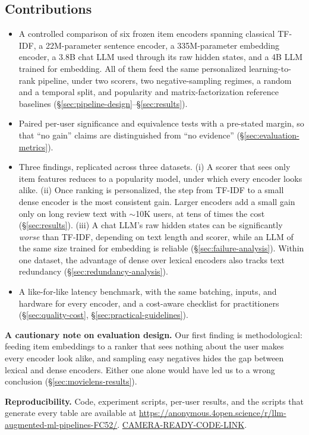 \subsection{Contributions}
\begin{itemize}
  \item A controlled comparison of six frozen item encoders spanning
    classical TF-IDF, a 22M-parameter sentence encoder, a 335M-parameter
    embedding encoder, a 3.8B chat LLM used through its raw hidden
    states, and a 4B LLM trained for embedding. All of them feed the
    same personalized learning-to-rank pipeline, under two scorers, two
    negative-sampling regimes, a random and a temporal split, and
    popularity and matrix-factorization reference baselines
    (\S\ref{sec:pipeline-design}--\S\ref{sec:results}).
  \item Paired per-user significance and equivalence tests with a
    pre-stated margin, so that ``no gain'' claims are distinguished from
    ``no evidence'' (\S\ref{sec:evaluation-metrics}).
  \item Three findings, replicated across three datasets. (i) A scorer
    that sees only item features reduces to a popularity model, under
    which every encoder looks alike. (ii) Once ranking is personalized,
    the step from TF-IDF to a small dense encoder is the most
    consistent gain. Larger encoders add a small gain only on long
    review text with $\sim$10K users, at tens of times the cost
    (\S\ref{sec:results}). (iii) A chat LLM's raw hidden states can be
    significantly \emph{worse} than TF-IDF, depending on text length
    and scorer, while an LLM of the same size trained for embedding is
    reliable (\S\ref{sec:failure-analysis}). Within one dataset, the
    advantage of dense over lexical encoders also tracks text redundancy
    (\S\ref{sec:redundancy-analysis}).
  \item A like-for-like latency benchmark, with the same batching, inputs,
    and hardware for every encoder, and a cost-aware checklist for
    practitioners (\S\ref{sec:quality-cost},
    \S\ref{sec:practical-guidelines}).
\end{itemize}

\textbf{A cautionary note on evaluation design.} Our first finding is
methodological: feeding item embeddings to a ranker that sees nothing
about the user makes every encoder look alike, and sampling easy
negatives hides the gap between lexical and dense encoders. Either one
alone would have led us to a wrong conclusion
(\S\ref{sec:movielens-results}).

\textbf{Reproducibility.} Code, experiment scripts, per-user results,
and the scripts that generate every table are available at
\ifanon
\url{https://anonymous.4open.science/r/llm-augmented-ml-pipelines-FC52/}.
\else
\url{CAMERA-READY-CODE-LINK}.
\fi
